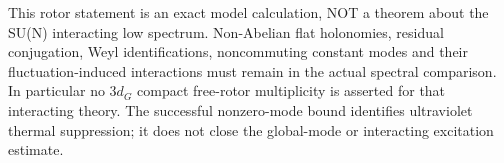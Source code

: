 \documentclass{article}
\begin{document}
This rotor statement is an exact model calculation, NOT a theorem about the SU(N) interacting low spectrum. Non-Abelian flat holonomies, residual conjugation, Weyl identifications, noncommuting constant modes and their fluctuation-induced interactions must remain in the actual spectral comparison. In particular no $3d_G$ compact free-rotor multiplicity is asserted for that interacting theory. The successful nonzero-mode bound identifies ultraviolet thermal suppression; it does not close the global-mode or interacting excitation estimate.
\end{document}
